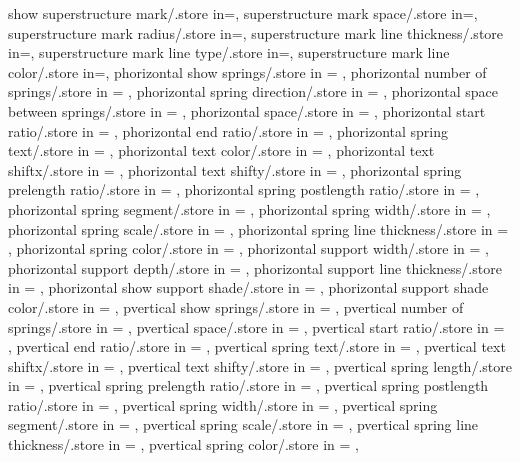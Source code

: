 {  show superstructure mark/.store in=\showmarksuper,
  superstructure mark space/.store in=\marksuperexspace,
  superstructure mark radius/.store in=\marksuperrad,
  superstructure mark line thickness/.store in=\marksuperlinet,
  superstructure mark line type/.store in=\marksuperlinetype,
  superstructure mark line color/.store in=\marksuperlinecolor,
  phorizontal show springs/.store in = \showphorizontalsprings,
  phorizontal number of springs/.store in = \phorspringnumber,
  phorizontal spring direction/.store in = \phorspringdir,
  phorizontal space between springs/.store in = \phorspbtwspr,
  phorizontal space/.store in = \phorspringspace,
  phorizontal start ratio/.store in = \phorspringstartratio,
  phorizontal end ratio/.store in = \phorspringendratio,
  phorizontal spring text/.store in = \phorspringtext,
  phorizontal text color/.store in = \phortextcolor,
  phorizontal text shiftx/.store in = \phortextshiftx,
  phorizontal text shifty/.store in = \phortextshifty,
  phorizontal spring prelength ratio/.store in = \phorprelenratio,
  phorizontal spring postlength ratio/.store in = \phorpostlenratio,
  phorizontal spring segment/.store in = \phorsegm,
  phorizontal spring width/.store in = \phorsprwid,
  phorizontal spring scale/.store in = \phorsprscale,
  phorizontal spring line thickness/.store in = \phorsprlinethk,
  phorizontal spring color/.store in = \phorsprcolor,
  phorizontal support width/.store in = \phorsuppwidth,
  phorizontal support depth/.store in = \phorsuppdepth,
  phorizontal support line thickness/.store in = \phorsupplinethk,
  phorizontal show support shade/.store in = \phorshowsuppshade,
  phorizontal support shade color/.store in = \phorsuppshadecol,
  pvertical show springs/.store in = \showpverticalsprings,
  pvertical number of springs/.store in = \pverspringnumber,
  pvertical space/.store in = \pverspringspace,
  pvertical start ratio/.store in = \pverspringstartratio,
  pvertical end ratio/.store in = \pverspringendratio,
  pvertical spring text/.store in = \pverspringtext,
  pvertical text shiftx/.store in = \pvertextshiftx,
  pvertical text shifty/.store in = \pvertextshifty,
  pvertical spring length/.store in = \pverspringlength,
  pvertical spring prelength ratio/.store in = \pverprelenratio,
  pvertical spring postlength ratio/.store in = \pverpostlenratio,
  pvertical spring width/.store in = \pverampl,
  pvertical spring segment/.store in = \pversegm,
  pvertical spring scale/.store in = \pverspringscale,
  pvertical spring line thickness/.store in = \pverspringthk,
  pvertical spring color/.store in = \pverspringcolor,
}

